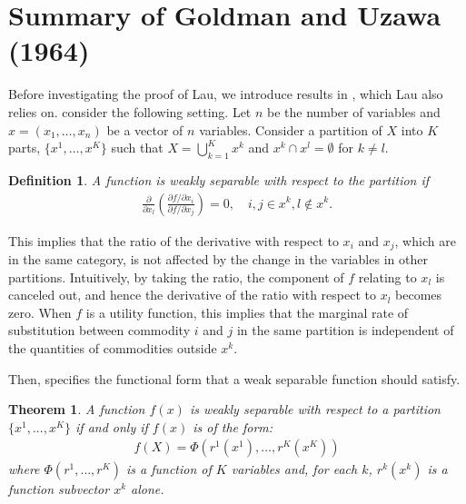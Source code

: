 \documentclass[11pt, a4paper]{article}
\newtheorem{theorem}{Theorem}
\newtheorem{definition}{Definition}
\theoremstyle{remark}
\begin{document}
\section{Summary of Goldman and Uzawa (1964)}
Before investigating the proof of Lau, we introduce results in \citet{goldmanNote1964}, which Lau also relies on.
\citet{goldmanNote1964} consider the following setting.
Let $n$ be the number of variables and $x = (x_{1},\ldots, x_{n})$ be a vector of $n$ variables.
Consider a partition of $X$ into $K$ parts, $\{x^1, \ldots, x^K\}$ such that $X = \bigcup_{k=1}^K x^k$ and $x^k \cap x^l = \emptyset$ for $k\ne l$.
\begin{framed}
    \begin{definition}\label{def:weal_separable}
        A function is weakly separable with respect to the partition if 
        \begin{align}
            \frac{\partial}{\partial x_l}\left(\frac{\partial f/\partial x_i}{\partial f/\partial x_j}\right) = 0, \quad i,j\in x^k, l \notin x^k.
        \end{align}
    \end{definition}
\end{framed}
This implies that the ratio of the derivative with respect to $x_i$ and $x_j$, which are in the same category, is not affected by the change in the variables in other partitions.
Intuitively, by taking the ratio, the component of $f$ relating to $x_l$ is canceled out, and hence the derivative of the ratio with respect to $x_l$ becomes zero.
When $f$ is a utility function, this implies that the marginal rate of substitution between commodity $i$ and $j$ in the same partition is independent of the quantities of commodities outside $x^k$.

Then, \citet{goldmanNote1964} specifies the functional form that a weak separable function should satisfy.
\begin{framed}
    \begin{theorem}\label{thorem_2_GU}
    A function $f(x)$ is weakly separable with respect to a partition $\{x^1, .. ., x^K\}$ if and only if $f(x)$ is of the form: 
    \begin{align}
        f(X) = \Phi(r^1(x^{1}),\ldots, r^K(x^{K})   )
    \end{align} where $\Phi(r^1,\ldots, r^K)$ is a function of $K$ variables and, for each $k$, $r^k(x^{k})$ is a function subvector $x^{k}$ alone.
    \end{theorem}
\end{framed}
\end{document}
